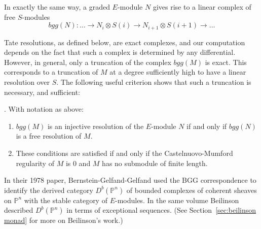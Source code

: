 \documentclass[twoside,12pt, leqno]{amsart}
\def\PP{{\mathbb P}}
\def\CU{{\mathcal U}}
\def\daniel#1{{\bf *** Daniel:} #1 {\bf ***}}
\begin{document}
In exactly the same way, a graded $E$-module $N$ gives rise to a linear  complex of free $S$-modules
$$bgg(N): \ldots \to N_i \otimes S(i) \to N_{i+1} \otimes  S(i+1) \to \ldots $$

Tate resolutions, as defined below, are exact complexes, and our computation depends on the fact that such a complex is
determined by any differential. However, in general, only a truncation of the complex $bgg(M)$ is exact. This corresponds to a truncation of $M$ at a degree sufficiently high to have a linear resolution over $S$. The following useful criterion shows that such a truncation is necessary, and sufficient:

\begin{theorem}[Reciprocity] \cite[Theorem 3.7 and Corollary 2.4] {EFS}\label{Reciprocity}. With notation as above:
\begin{enumerate}
 \item $bgg(M)$ is an injective resolution of the $E$-module $N$ if and only if
$bgg(N)$ is a free resolution of $M$.

\item These conditions are satisfied if and only if the Castelnuovo-Mumford regularity of $M$ is 0 and $M$ has no submodule of finite length.
\end{enumerate}
\end{theorem}


In their 1978 paper, Bernstein-Gelfand-Gelfand \cite{BGG} used the BGG correspondence to identify  the derived category $D^b(\PP^n)$ of bounded complexes of coherent sheaves on $\PP^n$ with the stable category of $E$-modules. In the same volume \cite{beilinson} Beilinson described
$D^b(\PP^n)$ in terms of exceptional sequences.  (See Section~\ref{sec:beilinson monad} for more on Beilinson's work.)

\end{document}
